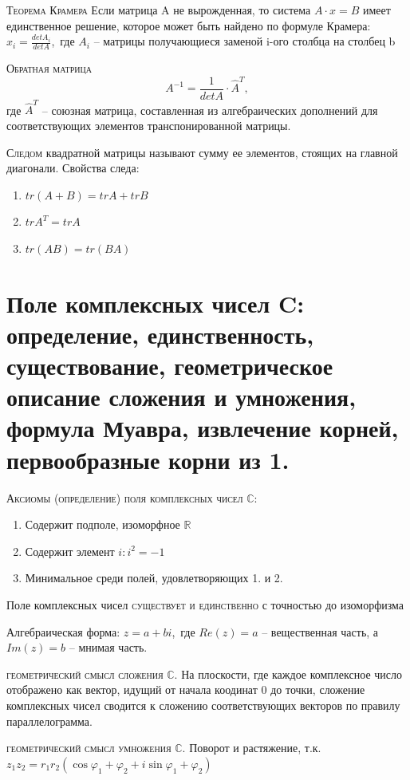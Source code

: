 \documentclass{article}
\begin{document}
\textsc{Теорема Крамера} Если матрица A не вырожденная, то система $A\cdot x=B$ имеет единственное решение,
которое может быть найдено по формуле Крамера: $x_i=\frac{det A_i}{det A}$, где $A_i$ – матрицы получающиеся заменой i-ого столбца на столбец b

\textsc{Обратная матрица}
$$A^{-1}=\frac{1}{det A}\cdot \hat{A}^T,$$
где $\hat{A}^T$ – союзная матрица, составленная из алгебраических дополнений для соответствующих элементов транспонированной матрицы.

\textsc{Следом} квадратной матрицы называют сумму ее элементов, стоящих на главной диагонали.
Свойства следа:
\begin{enumerate}
    \item $tr(A+B)=trA+trB$
    \item $trA^T=trA$
    \item $tr(AB)=tr(BA)$
\end{enumerate}

\section{Поле комплексных чисел C: определение, единственность, существование, геометрическое описание сложения и умножения, формула Муавра, извлечение корней, первообразные корни из 1.}

\textsc{Аксиомы (определение) поля комплексных чисел $\mathbb{C}$:}
\begin{enumerate}
    \item Содержит подполе, изоморфное $\mathbb{R}$
    \item Содержит элемент $i: i^2=-1$
    \item Минимальное среди полей, удовлетворяющих 1. и 2.
\end{enumerate}

Поле комплексных чисел \textsc{существует и единственно} с точностью до изоморфизма

Алгебраическая форма: $z=a+bi$, где $Re(z)=a$ – вещественная часть, а $Im(z)=b$ – мнимая часть.

\textsc{геометрический смысл сложения $\mathbb{C}$.}
На плоскости, где каждое комплексное число  отображено как вектор, идущий от начала коодинат 0 до точки, сложение комплексных чисел сводится к сложению соответствующих векторов по правилу параллелограмма.

\textsc{геометрический смысл умножения $\mathbb{C}$.}
Поворот и растяжение, т.к. $z_1z_2=r_1r_2(\cos{\varphi_1+\varphi_2}+i\sin{\varphi_1+\varphi_2})$
\end{document}
